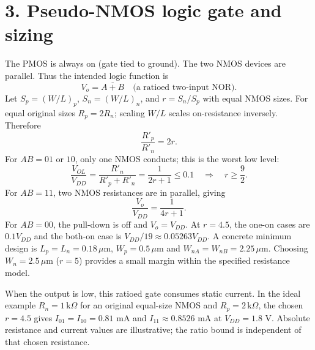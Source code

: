 \documentclass[11pt]{article}
\newcommand{\mos}[4]{\begin{scope}[shift={(#1,#2)}]
\draw (0,.24)--(0,-.24);
\draw (0,.20)--(.25,.20)--(.25,.5);
\draw (0,-.20)--(.25,-.20)--(.25,-.5);
\draw (-.16,.23)--(-.16,-.23);
\ifnum#4=1\draw (-.26,0) circle (.06);\draw (-.75,0)--(-.32,0);\else\draw (-.75,0)--(-.16,0);\fi
\node[anchor=east,font=\small] at (-.76,0) {$#3$};
\end{scope}}
\newcommand{\ground}[2]{\draw (#1,#2)--(#1,{#2-.12});\draw ({#1-.17},{#2-.12})--({#1+.17},{#2-.12});\draw ({#1-.11},{#2-.20})--({#1+.11},{#2-.20});}
\newcommand{\rail}[3]{\draw (#1,#2)--(#1,{#2+.15});\node[above,font=\small] at (#1,{#2+.15}) {$#3$};}
\newcommand{\outputnode}[3]{\fill (#1,#2) circle (.04);\draw (#1,#2)--({#1+.7},#2) node[right] {$#3$};}
\begin{document}
\section*{3. Pseudo-NMOS logic gate and sizing}
The PMOS is always on (gate tied to ground). The two NMOS devices are parallel. Thus the intended logic function is
\[
 \boxed{V_o=\overline{A+B}\quad\text{(a ratioed two-input NOR).}}
\]
Let $S_p=(W/L)_p$, $S_n=(W/L)_n$, and $r=S_n/S_p$ with equal NMOS sizes. For equal original sizes $R_p=2R_n$; scaling $W/L$ scales on-resistance inversely. Therefore
\[
 \frac{R'_p}{R'_n}=2r.
\]
For $AB=01$ or $10$, only one NMOS conducts; this is the worst low level:
\[
 \frac{V_{OL}}{V_{DD}}=\frac{R'_n}{R'_p+R'_n}=\frac{1}{2r+1}\le0.1
 \quad\Longrightarrow\quad\boxed{r\ge\frac92.}
\]
For $AB=11$, two NMOS resistances are in parallel, giving
\[
 \frac{V_o}{V_{DD}}=\frac{1}{4r+1}.
\]
For $AB=00$, the pull-down is off and $V_o=V_{DD}$. At $r=4.5$, the one-on cases are $0.1V_{DD}$ and the both-on case is $V_{DD}/19\approx0.05263V_{DD}$. A concrete minimum design is $L_p=L_n=0.18\,\mu$m, $W_p=0.5\,\mu$m and $W_{nA}=W_{nB}=2.25\,\mu$m. Choosing $W_n=2.5\,\mu$m ($r=5$) provides a small margin within the specified resistance model.

\begin{center}\end{center}
When the output is low, this ratioed gate consumes static current. In the ideal example $R_n=1\,\mathrm{k}\Omega$ for an original equal-size NMOS and $R_p=2\,\mathrm{k}\Omega$, the chosen $r=4.5$ gives $I_{01}=I_{10}=0.81$ mA and $I_{11}\approx0.8526$ mA at $V_{DD}=1.8$ V. Absolute resistance and current values are illustrative; the ratio bound is independent of that chosen resistance.
\end{document}
